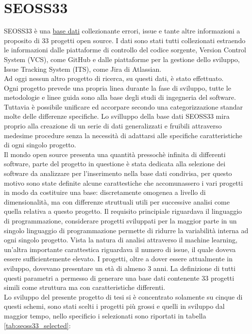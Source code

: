 \documentclass[%
    corpo=12pt,
    twoside,
    oldstyle,
    autoretitolo,
    greek,
    evenboxes,
]{toptesi}
\begin{document}
\section{SEOSS33}
SEOSS33\cite{SEOSS33} è una \href{https://doi.org/10.7910/DVN/PDDZ4Q}{base dati} collezionante errori, issue e tante altre informazioni a proposito di 33 progetti open source. I dati sono stati tutti collezionati estraendo le informazioni dalle piattaforme di controllo del codice sorgente, Version Control System (VCS), come GitHub e dalle piattaforme per la gestione dello sviluppo, Issue Tracking System (ITS), come Jira di Atlassian.\\
Ad oggi nessun altro progetto di ricerca, su questi dati, è stato effettuato.\\
Ogni progetto prevede una propria linea durante la fase di sviluppo, tutte le metodologie e linee guida sono alla base degli studi di ingegneria del software. Tuttavia è possibile unificare ed accorpare secondo una categorizzazione standar molte delle differenze specifiche. Lo svilluppo della base dati SEOSS33 mira proprio alla creazione di un serie di dati generalizzati e fruibili attraverso medesime procedure senza la necessità di adattarsi alle specifiche caratteristiche di ogni singolo progetto.\\
Il mondo open source presenta una quantità pressochè infinita di differenti software, parte del progetto in questione è stata dedicata alla selezione dei software da analizzare per l'inserimento nella base dati condivisa, per questo motivo sono state definite alcune carattestiche che accomunassero i vari progetti in modo da costituire una base: discretamente omogenea a livello di dimensionalità, ma con differenze struttuali utili per successive analisi come quella relativa a questo progetto. Il requisito principiale riguardava il linguaggio di programmazione, considerare progetti sviluppati per la maggior parte in un singolo linguaggio di programmazione permette di ridurre la variabilità interna ad ogni singolo progetto. Vista la natura di analisi attraverso il machine learning, un'altra importante carattestica riguardava il numero di issue, il quale doveva essere sufficientemente elevato. I progetti, oltre a dover essere attualmente in sviluppo, dovevano presentare un età di almeno 3 anni. La definizione di tutti questi parametri a permesso di generare una base dati contenente 33 progetti simili come struttura ma con caratteristiche differenti.\\
Lo sviluppo del presente progetto di tesi si è concentrato solamente su cinque di questi schemi, sono stati scelti i progetti più grossi e quelli in sviluppo dal maggior tempo, nello specificio i selezionati sono riportati in tabella \ref{tab:seoss33_selected}:
\end{document}
